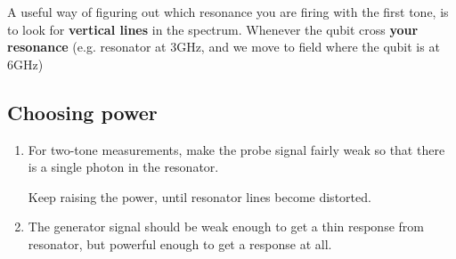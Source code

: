 \noindent A useful way  of figuring out which
resonance you are firing with the first tone,
is to look for \textbf{vertical lines} in the
spectrum.     Whenever   the    qubit   cross
\textbf{your  resonance} (e.g.   resonator at
3GHz, and we move to field where the qubit is
at 6GHz) 

\subsection{Choosing power}
\label{sec:choosing-power}

\begin{enumerate}
\item  For  two-tone measurements,  make  the
  probe signal  fairly weak so
  that  there  is  a  single  photon  in  the
  resonator.

  Keep  raising  the power,  until  resonator
  lines become distorted.

\item  The  generator signal  
  should  be  weak  enough   to  get  a  thin
  response   from  resonator,   but  powerful
  enough to get a response at all.
\end{enumerate}

\newpage
